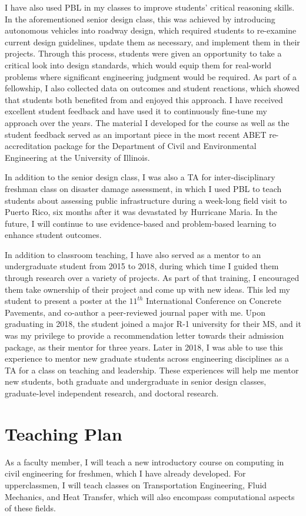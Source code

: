 \documentclass[12pt]{article}
\begin{document}
I have also used PBL in my classes to improve students' critical reasoning skills. In the aforementioned senior design class, this was achieved by introducing autonomous vehicles into roadway design, which required students to re-examine current design guidelines, update them as necessary, and implement them in their projects. Through this process, students were given an opportunity to take a critical look into design standards, which would equip them for real-world problems where significant engineering judgment would be required. As part of a fellowship, I also collected data on outcomes and student reactions, which showed that students both benefited from and enjoyed this approach. I have received excellent student feedback and have used it to continuously fine-tune my approach over the years. The material I developed for the course as well as the student feedback served as an important piece in the most recent ABET re-accreditation package for the Department of Civil and Environmental Engineering at the University of Illinois.

In addition to the senior design class, I was also a TA for inter-disciplinary freshman class on disaster damage assessment, in which I used PBL to teach students about assessing public infrastructure during a week-long field visit to Puerto Rico, six months after it was devastated by Hurricane Maria. In the future, I will continue to use evidence-based and problem-based learning to enhance student outcomes.

In addition to classroom teaching, I have also served as a mentor to an undergraduate student from 2015 to 2018, during which time I guided them through research over a variety of projects. As part of that training, I encouraged them take ownership of their project and come up with new ideas. This led my student to present a poster at the $11^{th}$ International Conference on Concrete Pavements, and co-author a peer-reviewed journal paper with me. Upon graduating in 2018, the student joined a major R-1 university for their MS, and it was my privilege to provide a recommendation letter towards their admission package, as their mentor for three years. Later in 2018, I was able to use this experience to mentor new graduate students across engineering disciplines as a TA for a class on teaching and leadership. These experiences will help me mentor new students, both graduate and undergraduate in senior design classes, graduate-level independent research, and doctoral research.

\section*{Teaching Plan}
As a faculty member, I will teach a new introductory course on computing in civil engineering for freshmen, which I have already developed. For upperclassmen, I will teach classes on Transportation Engineering, Fluid Mechanics, and Heat Transfer, which will also encompass computational aspects of these fields. 
\end{document}
